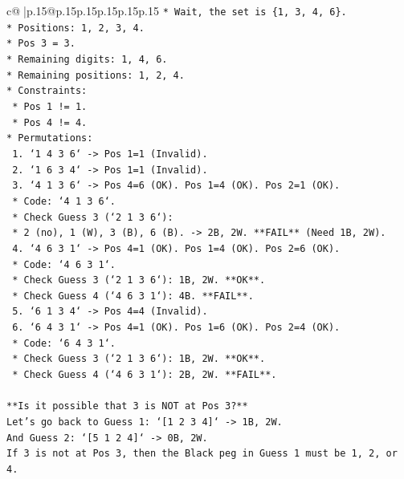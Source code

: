 \documentclass{article}
\begin{document}
{\begin{supertabular}{c@{$\;$}|p{.15\linewidth}@{}p{.15\linewidth}p{.15\linewidth}p{.15\linewidth}p{.15\linewidth}p{.15\linewidth}}
{{{\texttt{*   Wait, the set is \{1, 3, 4, 6\}.} \\
\texttt{*   Positions: 1, 2, 3, 4.} \\
\texttt{*   Pos 3 = 3.} \\
\texttt{*   Remaining digits: 1, 4, 6.} \\
\texttt{*   Remaining positions: 1, 2, 4.} \\
\texttt{*   Constraints:} \\
\texttt{    *   Pos 1 != 1.} \\
\texttt{    *   Pos 4 != 4.} \\
\texttt{*   Permutations:} \\
\texttt{    1.  `1 4 3 6` {-}> Pos 1=1 (Invalid).} \\
\texttt{    2.  `1 6 3 4` {-}> Pos 1=1 (Invalid).} \\
\texttt{    3.  `4 1 3 6` {-}> Pos 4=6 (OK). Pos 1=4 (OK). Pos 2=1 (OK).} \\
\texttt{        *   Code: `4 1 3 6`.} \\
\texttt{        *   Check Guess 3 (`2 1 3 6`):} \\
\texttt{            *   2 (no), 1 (W), 3 (B), 6 (B). {-}> 2B, 2W. **FAIL** (Need 1B, 2W).} \\
\texttt{    4.  `4 6 3 1` {-}> Pos 4=1 (OK). Pos 1=4 (OK). Pos 2=6 (OK).} \\
\texttt{        *   Code: `4 6 3 1`.} \\
\texttt{        *   Check Guess 3 (`2 1 3 6`): 1B, 2W. **OK**.} \\
\texttt{        *   Check Guess 4 (`4 6 3 1`): 4B. **FAIL**.} \\
\texttt{    5.  `6 1 3 4` {-}> Pos 4=4 (Invalid).} \\
\texttt{    6.  `6 4 3 1` {-}> Pos 4=1 (OK). Pos 1=6 (OK). Pos 2=4 (OK).} \\
\texttt{        *   Code: `6 4 3 1`.} \\
\texttt{        *   Check Guess 3 (`2 1 3 6`): 1B, 2W. **OK**.} \\
\texttt{        *   Check Guess 4 (`4 6 3 1`): 2B, 2W. **FAIL**.} \\
\\ 
\texttt{**Is it possible that 3 is NOT at Pos 3?**} \\
\texttt{Let's go back to Guess 1: `{[}1 2 3 4{]}` {-}> 1B, 2W.} \\
\texttt{And Guess 2: `{[}5 1 2 4{]}` {-}> 0B, 2W.} \\
\texttt{If 3 is not at Pos 3, then the Black peg in Guess 1 must be 1, 2, or 4.} \\
}}}
\end{supertabular}}
\end{document}

